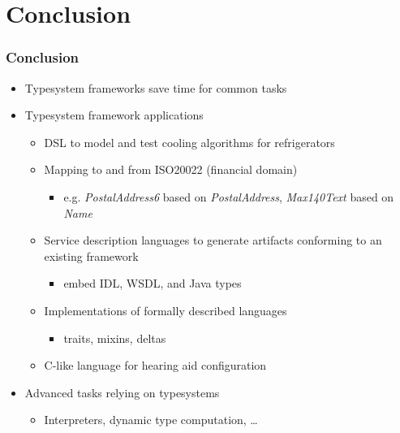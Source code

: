 \section{Conclusion}

\begin{frame}
  \frametitle{Conclusion}
  
  \begin{itemize}
    \item Typesystem frameworks save time for common tasks
    \item Typesystem framework applications
    \begin{itemize}
      \item DSL to model and test cooling algorithms for refrigerators 
      \item Mapping to and from ISO20022 (financial domain)
      \begin{itemize}
        \item e.g. \emph{PostalAddress6} based on \emph{PostalAddress},
        \emph{Max140Text} based on \emph{Name}
      \end{itemize}
      \item Service description languages to generate artifacts conforming
      to an existing framework
      \begin{itemize}
        \item embed IDL, WSDL, and Java types
      \end{itemize}
      \item Implementations of formally described languages
       \begin{itemize}
        \item traits, mixins, deltas
      \end{itemize}
      \item C-like language for hearing aid configuration
    \end{itemize}
    \item Advanced tasks relying on typesystems
    \begin{itemize}
      \item Interpreters, dynamic type computation, \ldots
    \end{itemize}
  \end{itemize}
\end{frame}

